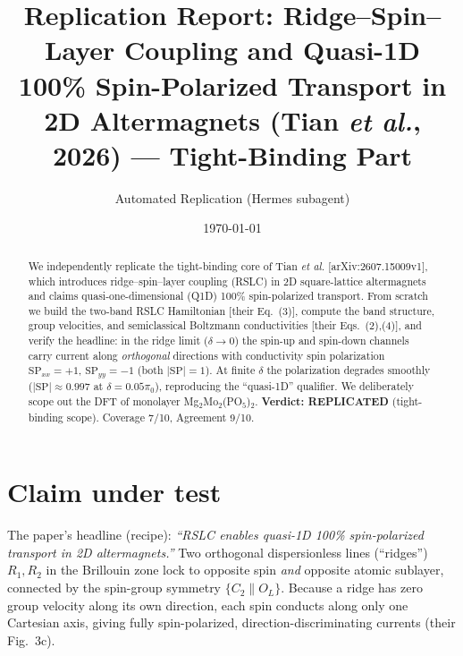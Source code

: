 \documentclass[aps,prl,twocolumn,superscriptaddress,floatfix]{revtex4-2}
\begin{document}
\title{Replication Report: Ridge--Spin--Layer Coupling and Quasi-1D 100\% Spin-Polarized Transport in 2D Altermagnets (Tian \emph{et al.}, 2026) --- Tight-Binding Part}
\author{Automated Replication (Hermes subagent)}
\date{\today}

\begin{abstract}
We independently replicate the tight-binding core of Tian \emph{et al.}
[arXiv:2607.15009v1], which introduces ridge--spin--layer coupling (RSLC) in
2D square-lattice altermagnets and claims quasi-one-dimensional (Q1D) 100\%
spin-polarized transport. From scratch we build the two-band RSLC Hamiltonian
[their Eq.~(3)], compute the band structure, group velocities, and
semiclassical Boltzmann conductivities [their Eqs.~(2),(4)], and verify the
headline: in the ridge limit ($\delta\to0$) the spin-up and spin-down channels
carry current along \emph{orthogonal} directions with conductivity spin
polarization $\mathrm{SP}_{xx}=+1$, $\mathrm{SP}_{yy}=-1$ (both $|\mathrm{SP}|=1$).
At finite $\delta$ the polarization degrades smoothly ($|\mathrm{SP}|\approx0.997$
at $\delta=0.05\pi_0$), reproducing the ``quasi-1D'' qualifier. We deliberately
scope out the DFT of monolayer Mg$_2$Mo$_2$(PO$_5$)$_2$.
\textbf{Verdict: REPLICATED} (tight-binding scope). Coverage 7/10, Agreement 9/10.
\end{abstract}

\maketitle

\section{Claim under test}
The paper's headline (recipe): \emph{``RSLC enables quasi-1D 100\%
spin-polarized transport in 2D altermagnets.''} Two orthogonal
dispersionless lines (``ridges'') $R_1,R_2$ in the Brillouin zone lock to
opposite spin \emph{and} opposite atomic sublayer, connected by the spin-group
symmetry $\{C_2\|O_L\}$. Because a ridge has zero group velocity along its own
direction, each spin conducts along only one Cartesian axis, giving fully
spin-polarized, direction-discriminating currents (their Fig.~3c).
\end{document}
